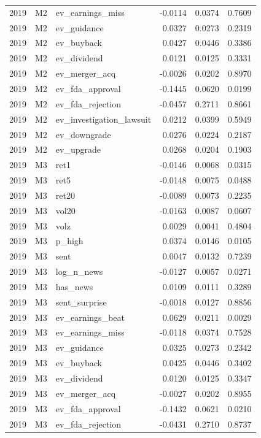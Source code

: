 \begin{tabular}{rllrrr}
2019 & M2 & ev\_earnings\_miss & -0.0114 & 0.0374 & 0.7609 \\
2019 & M2 & ev\_guidance & 0.0327 & 0.0273 & 0.2319 \\
2019 & M2 & ev\_buyback & 0.0427 & 0.0446 & 0.3386 \\
2019 & M2 & ev\_dividend & 0.0121 & 0.0125 & 0.3331 \\
2019 & M2 & ev\_merger\_acq & -0.0026 & 0.0202 & 0.8970 \\
2019 & M2 & ev\_fda\_approval & -0.1445 & 0.0620 & 0.0199 \\
2019 & M2 & ev\_fda\_rejection & -0.0457 & 0.2711 & 0.8661 \\
2019 & M2 & ev\_investigation\_lawsuit & 0.0212 & 0.0399 & 0.5949 \\
2019 & M2 & ev\_downgrade & 0.0276 & 0.0224 & 0.2187 \\
2019 & M2 & ev\_upgrade & 0.0268 & 0.0204 & 0.1903 \\
2019 & M3 & ret1 & -0.0146 & 0.0068 & 0.0315 \\
2019 & M3 & ret5 & -0.0148 & 0.0075 & 0.0488 \\
2019 & M3 & ret20 & -0.0089 & 0.0073 & 0.2235 \\
2019 & M3 & vol20 & -0.0163 & 0.0087 & 0.0607 \\
2019 & M3 & volz & 0.0029 & 0.0041 & 0.4804 \\
2019 & M3 & p\_high & 0.0374 & 0.0146 & 0.0105 \\
2019 & M3 & sent & 0.0047 & 0.0132 & 0.7239 \\
2019 & M3 & log\_n\_news & -0.0127 & 0.0057 & 0.0271 \\
2019 & M3 & has\_news & 0.0109 & 0.0111 & 0.3289 \\
2019 & M3 & sent\_surprise & -0.0018 & 0.0127 & 0.8856 \\
2019 & M3 & ev\_earnings\_beat & 0.0629 & 0.0211 & 0.0029 \\
2019 & M3 & ev\_earnings\_miss & -0.0118 & 0.0374 & 0.7528 \\
2019 & M3 & ev\_guidance & 0.0325 & 0.0273 & 0.2342 \\
2019 & M3 & ev\_buyback & 0.0425 & 0.0446 & 0.3402 \\
2019 & M3 & ev\_dividend & 0.0120 & 0.0125 & 0.3347 \\
2019 & M3 & ev\_merger\_acq & -0.0027 & 0.0202 & 0.8955 \\
2019 & M3 & ev\_fda\_approval & -0.1432 & 0.0621 & 0.0210 \\
2019 & M3 & ev\_fda\_rejection & -0.0431 & 0.2710 & 0.8737 \\

\end{tabular}
